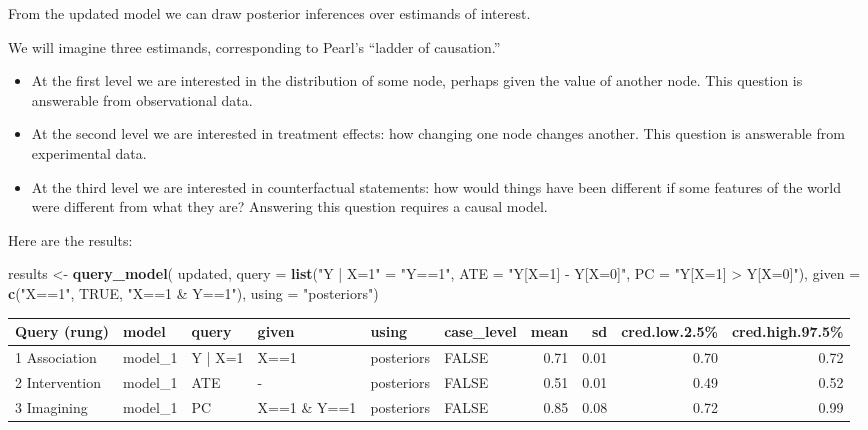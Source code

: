 \documentclass[
  12pt,
]{book}
\newenvironment{Shaded}{\begin{snugshade}}{\end{snugshade}}
\newcommand{\AttributeTok}[1]{\textcolor[rgb]{0.13,0.29,0.53}{#1}}
\newcommand{\ConstantTok}[1]{\textcolor[rgb]{0.56,0.35,0.01}{#1}}
\newcommand{\FunctionTok}[1]{\textcolor[rgb]{0.13,0.29,0.53}{\textbf{#1}}}
\newcommand{\NormalTok}[1]{#1}
\newcommand{\OtherTok}[1]{\textcolor[rgb]{0.56,0.35,0.01}{#1}}
\newcommand{\StringTok}[1]{\textcolor[rgb]{0.31,0.60,0.02}{#1}}
\begin{document}
From the updated model we can draw posterior inferences over estimands of interest.

We will imagine three estimands, corresponding to Pearl's ``ladder of causation.''

\begin{itemize}
\item
  At the first level we are interested in the distribution of some node, perhaps given the value of another node. This question is answerable from observational data.
\item
  At the second level we are interested in treatment effects: how changing one node changes another. This question is answerable from experimental data.
\item
  At the third level we are interested in counterfactual statements: how would things have been different if some features of the world were different from what they are? Answering this question requires a causal model.
\end{itemize}

Here are the results:

\begin{Shaded}
\begin{Highlighting}[]
\NormalTok{results }\OtherTok{\textless{}{-}} \FunctionTok{query\_model}\NormalTok{(}
\NormalTok{ updated,}
 \AttributeTok{query =} \FunctionTok{list}\NormalTok{(}\StringTok{"Y | X=1"} \OtherTok{=} \StringTok{"Y==1"}\NormalTok{, }
              \AttributeTok{ATE =} \StringTok{"Y[X=1] {-} Y[X=0]"}\NormalTok{, }
              \AttributeTok{PC  =} \StringTok{"Y[X=1] \textgreater{} Y[X=0]"}\NormalTok{),}
 \AttributeTok{given =} \FunctionTok{c}\NormalTok{(}\StringTok{"X==1"}\NormalTok{, }\ConstantTok{TRUE}\NormalTok{, }\StringTok{"X==1 \& Y==1"}\NormalTok{),}
 \AttributeTok{using =} \StringTok{"posteriors"}\NormalTok{)}
\end{Highlighting}
\end{Shaded}

\begin{tabular}{l|l|l|l|l|l|r|r|r|r}
\hline
Query (rung) & model & query & given & using & case\_level & mean & sd & cred.low.2.5\% & cred.high.97.5\%\\
\hline
1 Association & model\_1 & Y | X=1 & X==1 & posteriors & FALSE & 0.71 & 0.01 & 0.70 & 0.72\\
\hline
2 Intervention & model\_1 & ATE & - & posteriors & FALSE & 0.51 & 0.01 & 0.49 & 0.52\\
\hline
3 Imagining & model\_1 & PC & X==1 \& Y==1 & posteriors & FALSE & 0.85 & 0.08 & 0.72 & 0.99\\
\hline
\end{tabular}
\end{document}
